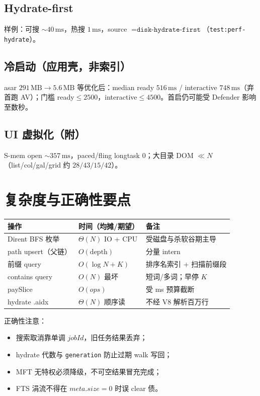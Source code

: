 \documentclass[UTF8,a4paper,11pt]{ctexart}
\begin{document}
\subsection{Hydrate-first}
样例：可搜 $\sim 40\,\mathrm{ms}$，热搜 $1\,\mathrm{ms}$，source $=\texttt{disk-hydrate-first}$（\texttt{test:perf-hydrate}）。

\subsection{冷启动（应用壳，非索引）}
asar $291\,\mathrm{MB}\to 5.6\,\mathrm{MB}$ 等优化后：median ready $516\,\mathrm{ms}$ / interactive $748\,\mathrm{ms}$（弃首跑 AV）；门槛 ready$\le 2500$，interactive$\le 4500$。首启仍可能受 Defender 影响至数秒。

\subsection{UI 虚拟化（附）}
S-mem open $\sim 357\,\mathrm{ms}$，paced/fling longtask $0$；大目录 DOM $\ll N$（list/col/gal/grid 约 $28/43/15/42$）。

\section{复杂度与正确性要点}

\begin{center}
\begin{tabular}{@{}lll@{}}
\toprule
操作 & 时间（均摊/期望） & 备注 \\
\midrule
Dirent BFS 枚举 & $\Theta(N)$ IO + CPU & 受磁盘与杀软谷期主导 \\
path upsert（父链） & $O(\mathrm{depth})$ & 分量 intern \\
前缀 query & $O(\log N + K)$ & 排序名索引 + 扫描前缀段 \\
contains query & $O(N)$ 最坏 & 短词/多词；早停 $K$ \\
paySlice & $O(ops)$ & 受 ms 预算截断 \\
hydrate .aidx & $\Theta(N)$ 顺序读 & 不经 V8 解析百万行 \\
\bottomrule
\end{tabular}
\end{center}

正确性注意：
\begin{itemize}[leftmargin=1.6em]
  \item 搜索取消靠单调 $jobId$，旧任务结果丢弃；
  \item hydrate 代数与 \texttt{generation} 防止过期 walk 写回；
  \item MFT 无特权必须降级，不可空结果冒充完成；
  \item FTS 涓流不得在 $meta.size=0$ 时误 clear 债。
\end{itemize}
\end{document}
